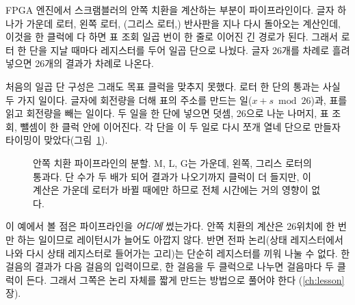 \Ours FPGA 엔진에서 스크램블러의 안쪽 치환을 계산하는 부분이 파이프라인이다. 글자 하나가 가운데 로터,
왼쪽 로터, (그리스 로터,) 반사판을 지나 다시 돌아오는 계산인데, 이것을 한 클럭에 다 하면 표 조회 일곱
번이 한 줄로 이어진 긴 경로가 된다. 그래서 로터 한 단을 지날 때마다 레지스터를 두어 일곱 단으로 나눴다.
글자 26개를 차례로 흘려 넣으면 26개의 결과가 차례로 나온다.

처음의 일곱 단 구성은 그래도 목표 클럭을 맞추지 못했다. 로터 한 단의 통과는 사실 두 가지 일이다.
글자에 회전량을 더해 표의 주소를 만드는 일($x + s \bmod 26$)과, 표를 읽고 회전량을 빼는 일이다.
두 일을 한 단에 넣으면 덧셈, 26으로 나눈 나머지, 표 조회, 뺄셈이 한 클럭 안에 이어진다. 각 단을 이 두
일로 다시 쪼개 열네 단으로 만들자 타이밍이 맞았다(그림~\ref{fig:g-inner-pipe}).

\begin{figure}[ht]
\centering
{}
\caption{안쪽 치환 파이프라인의 분할. M, L, G는 가운데, 왼쪽, 그리스 로터의 통과다. 단 수가 두 배가 되어
결과가 나오기까지 클럭이 더 들지만, 이 계산은 가운데 로터가 바뀔 때에만 하므로 전체 시간에는 거의 영향이
없다.}
\label{fig:g-inner-pipe}
\end{figure}

이 예에서 볼 점은 파이프라인을 \emph{어디에} 썼는가다. 안쪽 치환의 계산은 26위치에 한 번만 하는 일이므로
레이턴시가 늘어도 아깝지 않다. 반면 전파 논리(상태 레지스터에서 나와 다시 상태 레지스터로 들어가는 고리)는
단순히 레지스터를 끼워 나눌 수 없다. 한 걸음의 결과가 다음 걸음의 입력이므로, 한 걸음을 두 클럭으로 나누면
걸음마다 두 클럭이 든다. 그래서 그쪽은 논리 자체를 짧게 만드는 방법으로 풀어야 한다
(\ref{ch:lesson}장).

